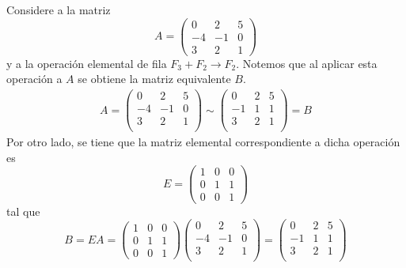 \documentclass[compacto,10pt]{pubciencias-notas}
\begin{document}
\begin{ejem}\hspace{0pt} Considere a la matriz 
\[
    A=\begin{pmatrix}0&2&5\\-4&-1&0\\3&2&1\end{pmatrix}
\]
y a la operación elemental de fila $F_3+F_2\rightarrow F_2$. Notemos que al aplicar esta operación a $A$ se obtiene la matriz equivalente $B$.
\begin{align*}
	A=\begin{pmatrix}
	0&2&5\\
	-4&-1&0\\
	3&2&1\\
	\end{pmatrix}
	\sim
	 \begin{pmatrix}
    0&2&5\\
    -1&1&1\\
    3&2&1\\
    \end{pmatrix} = B
\end{align*}
Por otro lado, se tiene que la matriz elemental correspondiente a dicha operación es
\[
    E=
    \begin{pmatrix}1&0&0\\0&1&1\\0&0&1\end{pmatrix}
\]
tal que 
\[
    B=EA=\begin{pmatrix}1&0&0\\0&1&1\\0&0&1\end{pmatrix}\begin{pmatrix}
	0&2&5\\
	-4&-1&0\\
	3&2&1\\
	\end{pmatrix}=\begin{pmatrix}
    0&2&5\\
    -1&1&1\\
    3&2&1\\
    \end{pmatrix}
\]
\end{ejem}
\end{document}
